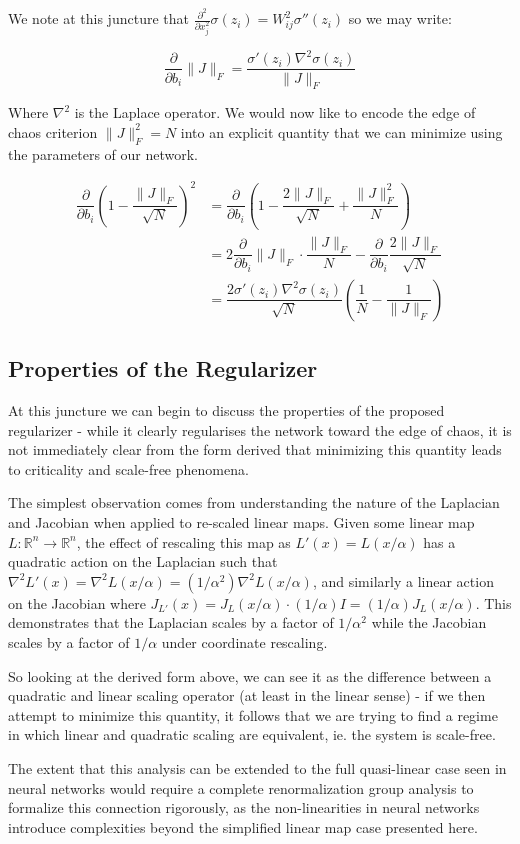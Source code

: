 We note at this juncture that $\frac{\partial^2}{\partial x_j^2} \sigma(z_i) = W_{ij}^2 \sigma''(z_i)$ so we may write:

\begin{equation}
\dfrac{\partial}{\partial b_i}\|J\|_F = \dfrac{\sigma'(z_i) \nabla^2\sigma(z_i)}{\|J\|_F}
\end{equation}

Where $\nabla^2$ is the Laplace operator. We would now like to encode the edge of chaos criterion $\|J\|_F^2=N$ into an explicit quantity that we can minimize using the parameters of our network.

\begin{align}
\dfrac{\partial}{\partial b_i} \left(1-\dfrac{\|J\|_F}{\sqrt{N}}\right)^2 &=  \dfrac{\partial}{\partial b_i}\left(1-\dfrac{2\|J\|_F}{\sqrt{N}}+\dfrac{\|J\|_F^2}{N}\right)\\
&= 2\dfrac{\partial}{\partial b_i}\|J\|_F\cdot\dfrac{\|J\|_F}{N} - \dfrac{\partial}{\partial b_i} \dfrac{2\|J\|_F}{\sqrt{N}}\\
&= \dfrac{2 \sigma'(z_i)\nabla^2 \sigma(z_i)}{\sqrt{N}}\left(\dfrac{1}{N}-\dfrac{1}{\|J\|_F}\right)
\end{align}

\subsection{Properties of the Regularizer}

At this juncture we can begin to discuss the properties of the proposed regularizer - while it clearly regularises the network toward the edge of chaos, it is not immediately clear from the form derived that minimizing this quantity leads to criticality and scale-free phenomena.

The simplest observation comes from understanding the nature of the Laplacian and Jacobian when applied to re-scaled linear maps. Given some linear map $L:\mathbb{R}^n\to \mathbb{R}^n$, the effect of rescaling this map as $L'(x) = L(x/\alpha)$ has a quadratic action on the Laplacian such that $\nabla^2 L'(x) = \nabla^2 L(x/\alpha) = (1/\alpha^2)\nabla^2 L(x/\alpha)$, and similarly a linear action on the Jacobian where $J_{L'}(x) = J_L(x/\alpha) \cdot (1/\alpha)I = (1/\alpha)J_L(x/\alpha)$. This demonstrates that the Laplacian scales by a factor of $1/\alpha^2$ while the Jacobian scales by a factor of $1/\alpha$ under coordinate rescaling.

So looking at the derived form above, we can see it as the difference between a quadratic and linear scaling operator (at least in the linear sense) - if we then attempt to minimize this quantity, it follows that we are trying to find a regime in which linear and quadratic scaling are equivalent, ie. the system is scale-free.

The extent that this analysis can be extended to the full quasi-linear case seen in neural networks would require a complete renormalization group analysis to formalize this connection rigorously, as the non-linearities in neural networks introduce complexities beyond the simplified linear map case presented here.